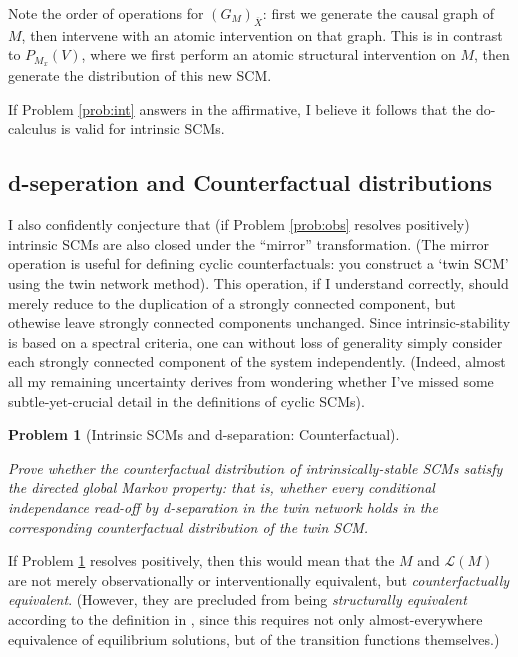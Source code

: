 \documentclass[letterpaper,10pt]{article}
\newtheorem{problem}{Problem}
\begin{document}
Note the order of operations for $(G_M)_{\overline{X}}$: first we generate the causal graph of $M$, then intervene with an atomic intervention on that graph. This is in contrast to $P_{M_x}(V)$, where we first perform an atomic structural intervention on $M$, then generate the distribution of this new SCM.

If Problem \ref{prob:int} answers in the affirmative, I believe it follows that the do-calculus is valid for intrinsic SCMs.

\subsection{d-seperation and Counterfactual distributions}

I also confidently conjecture that (if Problem \ref{prob:obs} resolves positively) intrinsic SCMs are also closed under the “mirror” transformation.
(The mirror operation is useful for defining cyclic counterfactuals: you construct a `twin SCM' using the twin network method). 
This operation, if I understand correctly, should merely reduce to the duplication of a strongly connected component, but othewise leave strongly connected components unchanged. Since intrinsic-stability is based on a spectral criteria, one can without loss of generality simply consider each strongly connected component of the system independently. (Indeed, almost all my remaining uncertainty derives from wondering whether I've missed some subtle-yet-crucial detail in the definitions of cyclic SCMs).

\begin{problem}[Intrinsic SCMs and d-separation: Counterfactual]
\label{prob:count}

Prove whether the counterfactual distribution of intrinsically-stable SCMs satisfy the directed global Markov property: that is, whether every conditional independance read-off by d-separation in the twin network holds in the corresponding counterfactual distribution of the twin SCM.
\end{problem}

If Problem \ref{prob:count} resolves positively, then this would mean that the $M$ and $\mathcal{L}(M)$ are not merely observationally or interventionally equivalent, but \emph{counterfactually equivalent}. (However, they are precluded from being \emph{structurally equivalent} according to the definition in \cite{Foundations}, since this requires not only almost-everywhere equivalence of equilibrium solutions, but of the transition functions themselves.)
\end{document}
